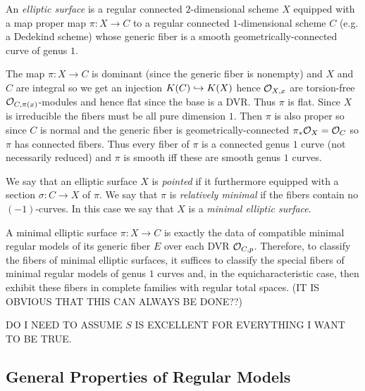 \documentclass[12pt]{article}
\begin{document}
\begin{defn}
An \textit{elliptic surface} is a regular connected $2$-dimensional scheme $X$ equipped with a map proper map $\pi : X \to C$ to a regular connected $1$-dimensional scheme $C$ (e.g. a Dedekind scheme) whose generic fiber is a smooth geometrically-connected curve of genus $1$.
\end{defn}

\begin{rmk}
The map $\pi : X \to C$ is dominant (since the generic fiber is nonempty) and $X$ and $C$ are integral so we get an injection $K(C) \hookrightarrow K(X)$ hence $\mathcal{O}_{X, x}$ are torsion-free $\mathcal{O}_{C, \pi(x)}$-modules and hence flat since the base is a DVR. Thus $\pi$ is flat. Since $X$ is irreducible the fibers must be all pure dimension $1$. Then $\pi$ is also proper so since $C$ is normal and the generic fiber is geometrically-connected $\pi_* \mathcal{O}_{X} = \mathcal{O}_{C}$ so $\pi$ has connected fibers. Thus every fiber of $\pi$ is a connected genus $1$ curve (not necessarily reduced) and $\pi$ is smooth iff these are smooth genus $1$ curves. 
\end{rmk}

\begin{defn}
We say that an elliptic surface $X$ is \textit{pointed} if it furthermore equipped with a section $\sigma : C \to X$ of $\pi$. We say that $\pi$ is \textit{relatively minimal} if the fibers contain no $(-1)$-curves. In this case we say that $X$ is a \textit{minimal elliptic surface}.
\end{defn}

\begin{rmk}
A minimal elliptic surface $\pi : X \to C$ is exactly the data of compatible minimal regular models of its generic fiber $E$ over each DVR $\mathcal{O}_{C, p}$. Therefore, to classify the fibers of minimal elliptic surfaces, it suffices to classify the special fibers of minimal regular models of genus $1$ curves and, in the equicharacteristic case, then exhibit these fibers in complete families with regular total spaces. (IT IS OBVIOUS THAT THIS CAN ALWAYS BE DONE??)
\end{rmk}

\begin{rmk}
DO I NEED TO ASSUME $S$ IS EXCELLENT FOR EVERYTHING I WANT TO BE TRUE.
\end{rmk}

\subsection{General Properties of Regular Models}
\end{document}
